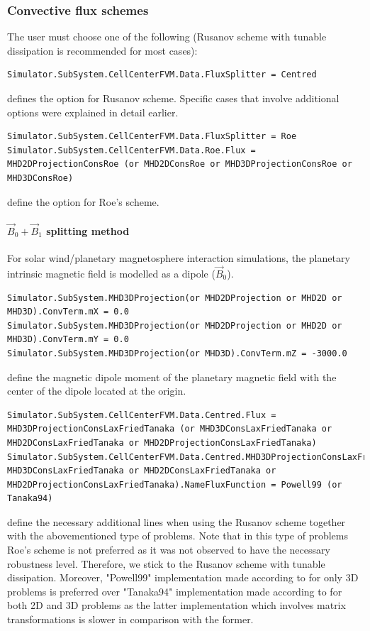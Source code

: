 \documentclass[11pt]{article}
\begin{document}
\subsubsection{Convective flux schemes}

The user must choose one of the following (Rusanov scheme with tunable dissipation is recommended for most cases):

\begin{lstlisting}[breaklines]
Simulator.SubSystem.CellCenterFVM.Data.FluxSplitter = Centred
\end{lstlisting}
defines the option for Rusanov scheme. Specific cases that involve additional options were explained in detail earlier.

\begin{lstlisting}[breaklines]
Simulator.SubSystem.CellCenterFVM.Data.FluxSplitter = Roe
Simulator.SubSystem.CellCenterFVM.Data.Roe.Flux = MHD2DProjectionConsRoe (or MHD2DConsRoe or MHD3DProjectionConsRoe or MHD3DConsRoe)
\end{lstlisting}
define the option for Roe's scheme.

\paragraph{$\vec{B}_0+\vec{B}_1$ splitting method}

For solar wind/planetary magnetosphere interaction simulations, the planetary intrinsic magnetic field is modelled as a dipole ($\vec{B}_0$).

\begin{lstlisting}[breaklines]
Simulator.SubSystem.MHD3DProjection(or MHD2DProjection or MHD2D or MHD3D).ConvTerm.mX = 0.0
Simulator.SubSystem.MHD3DProjection(or MHD2DProjection or MHD2D or MHD3D).ConvTerm.mY = 0.0
Simulator.SubSystem.MHD3DProjection(or MHD3D).ConvTerm.mZ = -3000.0
\end{lstlisting}
define the magnetic dipole moment of the planetary magnetic field with the center of the dipole located at the origin.

\begin{lstlisting}[breaklines]
Simulator.SubSystem.CellCenterFVM.Data.Centred.Flux = MHD3DProjectionConsLaxFriedTanaka (or MHD3DConsLaxFriedTanaka or MHD2DConsLaxFriedTanaka or MHD2DProjectionConsLaxFriedTanaka)
Simulator.SubSystem.CellCenterFVM.Data.Centred.MHD3DProjectionConsLaxFriedTanaka(or MHD3DConsLaxFriedTanaka or MHD2DConsLaxFriedTanaka or MHD2DProjectionConsLaxFriedTanaka).NameFluxFunction = Powell99 (or Tanaka94)
\end{lstlisting}
define the necessary additional lines when using the Rusanov scheme together with the abovementioned type of problems. Note that in this type of problems Roe's scheme is not preferred as it was not observed to have the necessary robustness level. Therefore, we stick to the Rusanov scheme with tunable dissipation. Moreover, "Powell99" implementation made according to \cite{powell99} for only 3D problems is preferred over "Tanaka94" implementation made according to \cite{tanaka94} for both 2D and 3D problems as the latter implementation which involves matrix transformations is slower in comparison with the former. 
\end{document}
